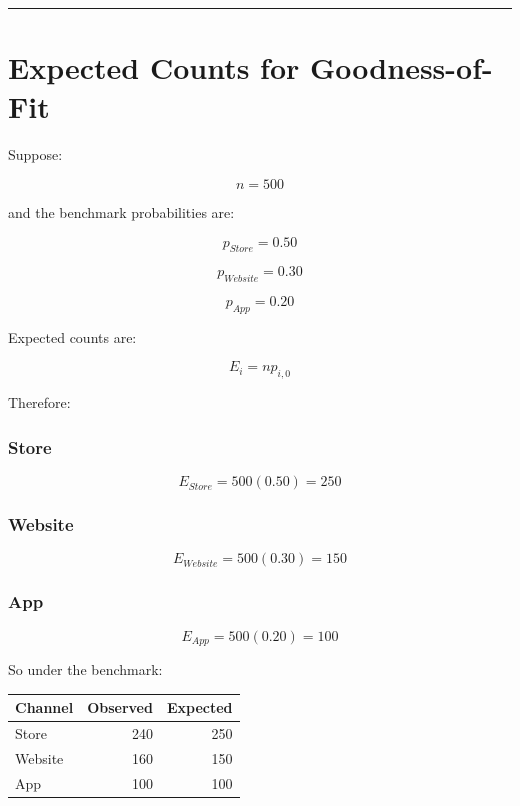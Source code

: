 \documentclass[
  letterpaper,
  DIV=11,
  numbers=noendperiod]{scrreprt}
\newcounter{none} %
\begin{document}
\begin{center}\rule{0.5\linewidth}{0.5pt}\end{center}


\chapter{Expected Counts for
Goodness-of-Fit}\label{expected-counts-for-goodness-of-fit}

Suppose:

\[
n=500
\]

and the benchmark probabilities are:

\[
p_{Store}=0.50
\]

\[
p_{Website}=0.30
\]

\[
p_{App}=0.20
\]

Expected counts are:

\[
E_i=np_{i,0}
\]

Therefore:

\subsection{Store}\label{store}

\[
E_{Store}
=
500(0.50)
=
250
\]

\subsection{Website}\label{website}

\[
E_{Website}
=
500(0.30)
=
150
\]

\subsection{App}\label{app}

\[
E_{App}
=
500(0.20)
=
100
\]

So under the benchmark:

{\def\LTcaptype{none} %
\begin{longtable}[]{@{}lrr@{}}
\toprule\noalign{}
Channel & Observed & Expected \\
\midrule\noalign{}
\endhead
\bottomrule\noalign{}
\endlastfoot
Store & 240 & 250 \\
Website & 160 & 150 \\
App & 100 & 100 \\
\end{longtable}
}
\end{document}
